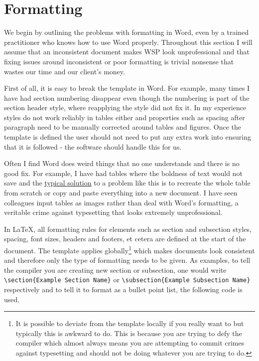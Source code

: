 \section{Formatting}
\label{sec:Formatting}

We begin by outlining the problems with formatting in Word, even by a trained practitioner who knows how to use Word properly. Throughout this section I will assume that an inconsistent document makes WSP look unprofessional and that fixing issues around inconsistent or poor formatting is trivial nonsense that wastes our time and our client's money.

First of all, it is easy to break the template in Word. For example, many times I have had section numbering disappear even though the numbering is part of the section header style, where reapplying the style did not fix it. In my experience styles do not work reliably in tables either and properties such as spacing after paragraph need to be manually corrected around tables and figures. Once the template is defined the user should not need to put any extra work into ensuring that it is followed - the software should handle this for us.

Often I find Word does weird things that no one understands and there is no good fix. For example, I have had tables where the boldness of text would not save and the \href{https://learn.microsoft.com/en-us/answers/questions/5092571/tables-in-ms-word-are-changing-when-saved-and-re-o}{\underline{typical solution}} to a problem like this is to recreate the whole table from scratch or copy and paste everything into a new document. I have seen colleagues input tables as images rather than deal with Word's formatting, a veritable crime against typesetting that looks extremely unprofessional.

In \LaTeX, all formatting rules for elements such as section and subsection styles, spacing, font sizes, headers and footers, et cetera are defined at the start of the document. The template applies globally\footnote{It is possible to deviate from the template locally if you really want to but typically this is awkward to do. This is because you are trying to defy the compiler which almost always means you are attempting to commit crimes against typesetting and should not be doing whatever you are trying to do.} which makes documents look consistent and therefore only the type of formatting needs to be given. As examples, to tell the compiler you are creating new section or subsection, one would write \lstinline_\section{Example Section Name}_ or \lstinline_\subsection{Example Subsection Name}_ respectively and to tell it to format as a bullet point list, the following code is used.

